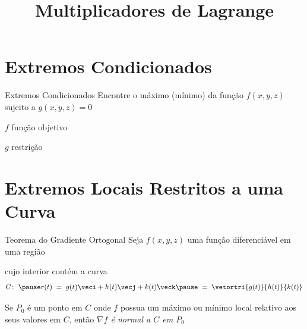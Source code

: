 
\usepackage{calculo_varias_variaveis-1}

\title{Multiplicadores de Lagrange}



\addtitle

\section{Extremos Condicionados}

\begin{frame}{Extremos Condicionados}
  Encontre o máximo (mínimo) da função \(f(x, y, z)\)\\[2mm]
  sujeito a \(g(x, y, z) = 0\)

  \pause
  \vspace{\baselineskip}
  \quad \emph{$f$} \quad função objetivo

  \pause
  \quad \emph{$g$} \quad restrição
\end{frame}


\section{Extremos Locais Restritos a uma Curva}

\begin{frame}{Teorema do Gradiente Ortogonal}
  Seja \(f(x, y, z)\) uma função diferenciável em uma região

  \pause
  cujo interior contém a curva
  \[
    C\colon\;
    \pause r(t) \;=\; g(t)\veci + h(t)\vecj + k(t)\veck
    \pause \;=\; \vetortri{g(t)}{h(t)}{k(t)}
  \]

  \pause
  Se $P_0$ é um ponto em $C$ onde $f$ possua um máximo ou mínimo local relativo
  aos seus valores em $C$,
  \pause
  então \emph{\(\nabla f\) é normal a $C$ em $P_0$}
\end{frame}

